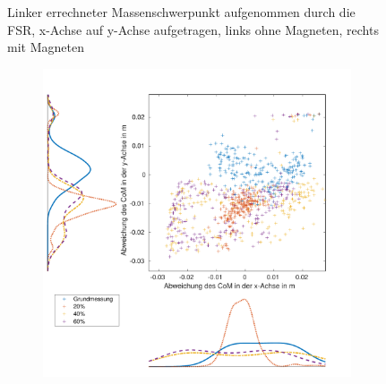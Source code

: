\begin{figure}[tb]
\begin{adjustwidth}{-0.2\linewidth}{-0.2\linewidth}
\begin{subfigure}[c]{.45\linewidth}
			\vspace{5pt}
		\end{subfigure}
	\end{adjustwidth}
	\caption{Linker errechneter Massenschwerpunkt aufgenommen durch die FSR, x-Achse auf y-Achse aufgetragen, links ohne Magneten, rechts mit Magneten} \label{CoM_links}
\end{figure}
\begin{figure}[tb]
	\centering
	\begin{adjustwidth}{-0.2\linewidth}{-0.2\linewidth}
		\hspace{40pt}
		\begin{subfigure}[c]{.45\linewidth}
			\centering
			\includegraphics[width=\linewidth]{Bilder/rechts_CoM_ohneM.pdf}
			\vspace{5pt}
		\end{subfigure}
		\hspace{-10pt}
		\begin{subfigure}[c]{.45\linewidth}
			\centering

\end{subfigure}
\end{adjustwidth}
\end{figure}
